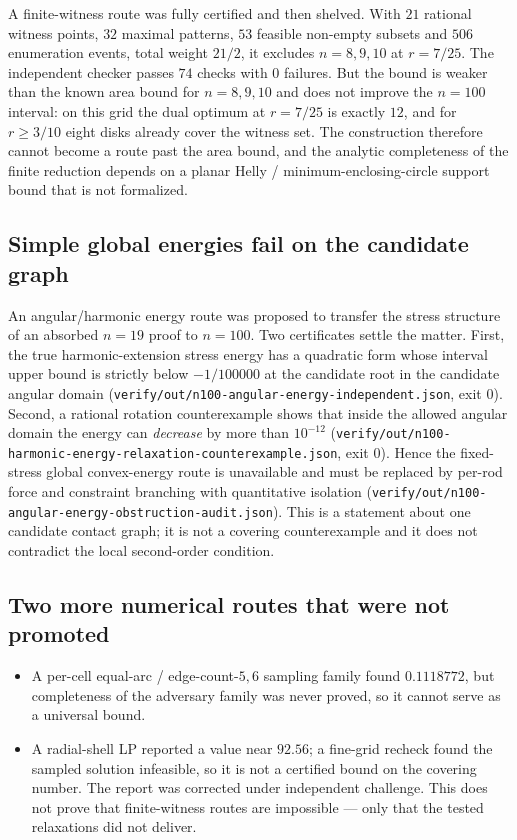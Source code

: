 A finite-witness route was fully certified and then shelved. With $21$ rational witness points,
$32$ maximal patterns, $53$ feasible non-empty subsets and $506$ enumeration events, total weight
$21/2$, it excludes $n=8,9,10$ at $r=7/25$. The independent checker passes $74$ checks with $0$
failures. But the bound is weaker than the known area bound for $n=8,9,10$ and does not improve the
$n=100$ interval: on this grid the dual optimum at $r=7/25$ is exactly $12$, and for $r\ge3/10$
eight disks already cover the witness set. The construction therefore cannot become a route past
the area bound, and the analytic completeness of the finite reduction depends on a planar
Helly / minimum-enclosing-circle support bound that is not formalized.

\subsection{Simple global energies fail on the candidate graph}

An angular/harmonic energy route was proposed to transfer the stress structure of an absorbed
$n=19$ proof to $n=100$. Two certificates settle the matter. First, the true harmonic-extension
stress energy has a quadratic form whose interval upper bound is strictly below $-1/100000$ at the
candidate root in the candidate angular domain
({\footnotesize\texttt{verify/\allowbreak{}out/\allowbreak{}n100-\allowbreak{}angular-\allowbreak{}energy-\allowbreak{}independent.json}}, exit $0$). Second, a rational rotation
counterexample shows that inside the allowed angular domain the energy can \emph{decrease} by more
than $10^{-12}$
({\footnotesize\texttt{verify/\allowbreak{}out/\allowbreak{}n100-\allowbreak{}harmonic-\allowbreak{}energy-\allowbreak{}relaxation-\allowbreak{}counterexample.json}}, exit $0$). Hence the
fixed-stress global convex-energy route is unavailable and must be replaced by per-rod force and
constraint branching with quantitative isolation
({\footnotesize\texttt{verify/\allowbreak{}out/\allowbreak{}n100-\allowbreak{}angular-\allowbreak{}energy-\allowbreak{}obstruction-\allowbreak{}audit.json}}). This is a statement about one
candidate contact graph; it is not a covering counterexample and it does not contradict the local
second-order condition.

\subsection{Two more numerical routes that were not promoted}

\begin{itemize}[leftmargin=1.4em,itemsep=2pt]
\item A per-cell equal-arc / edge-count-$5,6$ sampling family found $0.1118772$, but completeness of
the adversary family was never proved, so it cannot serve as a universal bound.
\item A radial-shell LP reported a value near $92.56$; a fine-grid recheck found the sampled
solution infeasible, so it is not a certified bound on the covering number. The report was corrected
under independent challenge. This does not prove that finite-witness routes are impossible --- only
that the tested relaxations did not deliver.
\end{itemize}
